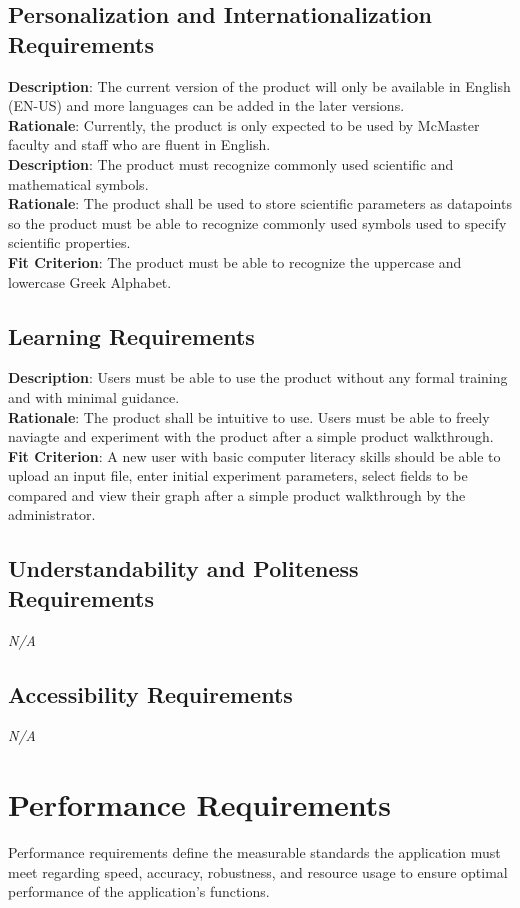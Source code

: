 \documentclass[12pt]{article}
\begin{document}
\subsection{Personalization and Internationalization Requirements}
\textbf{Description}: The current version of the product will only be available in English (EN-US) and more languages can be added in the later versions.\\
\textbf{Rationale}: Currently, the product is only expected to be used by McMaster faculty and staff who are fluent in English.\\
\newline
\textbf{Description}: The product must recognize commonly used scientific and mathematical symbols.\\
\textbf{Rationale}: The product shall be used to store scientific parameters as datapoints so the product must be able to recognize commonly used symbols used to specify scientific properties.\\
\textbf{Fit Criterion}: The product must be able to recognize the uppercase and lowercase Greek Alphabet.

\subsection{Learning Requirements}
\textbf{Description}: Users must be able to use the product without any formal training and with minimal guidance.\\
\textbf{Rationale}: The product shall be intuitive to use. Users must be able to freely naviagte and experiment with the product after a simple product walkthrough.\\
\textbf{Fit Criterion}: A new user with basic computer literacy skills should be able to upload an input file, enter initial experiment parameters, select fields to be compared and view their graph
after a simple product walkthrough by the administrator.

\subsection{Understandability and Politeness Requirements}
\emph{N/A}

\subsection{Accessibility Requirements}
\emph{N/A}

\section{Performance Requirements}
Performance requirements define the measurable standards the application must meet regarding speed, accuracy, robustness, and resource usage to ensure optimal performance of the application's functions.
\end{document}
